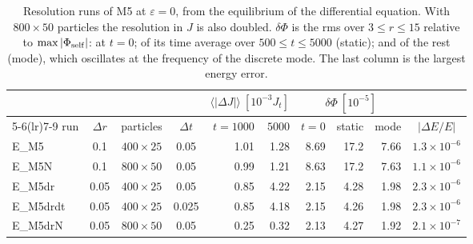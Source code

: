 \documentclass[11pt,a4paper]{article}
\begin{document}
\begin{table}[!htbp]
\centering
\small
\begin{tabular}{lcccrrrrrc}
\toprule
 & & & & \multicolumn{2}{c}{$\langle|\Delta J|\rangle\ [10^{-3}J_t]$} & \multicolumn{3}{c}{$\delta\Phi\ [10^{-5}]$} & \\
\cmidrule(lr){5-6}\cmidrule(lr){7-9}
run & $\Delta r$ & particles & $\Delta t$ & $t=1000$ & $5000$ & $t=0$ & static & mode & $|\Delta E/E|$\\
\midrule
E\_M5 & 0.1 & $400\times25$ & 0.05 & 1.01 & 1.28 & 8.69 & 17.2 & 7.66 & $1.3\times10^{-6}$\\
E\_M5N & 0.1 & $800\times50$ & 0.05 & 0.99 & 1.21 & 8.63 & 17.2 & 7.63 & $1.1\times10^{-6}$\\
E\_M5dr & 0.05 & $400\times25$ & 0.05 & 0.85 & 4.22 & 2.15 & 4.28 & 1.98 & $2.3\times10^{-6}$\\
E\_M5drdt & 0.05 & $400\times25$ & 0.025 & 0.85 & 4.18 & 2.15 & 4.26 & 1.98 & $2.3\times10^{-6}$\\
E\_M5drN & 0.05 & $800\times50$ & 0.05 & 0.25 & 0.32 & 2.13 & 4.27 & 1.92 & $2.1\times10^{-7}$\\
\bottomrule
\end{tabular}
\caption{Resolution runs of M5 at $\varepsilon=0$, from the equilibrium of the differential
equation. With $800\times50$ particles the resolution in $J$ is also doubled. $\delta\Phi$ is the
rms over $3\le r\le15$ relative to $\max|\Phi_{\rm self}|$: at $t=0$; of its time average over
$500\le t\le5000$ (static); and of the rest (mode), which oscillates at the frequency of the
discrete mode. The last column is the largest energy error.}
\label{tab:resolucion}
\end{table}
\end{document}
